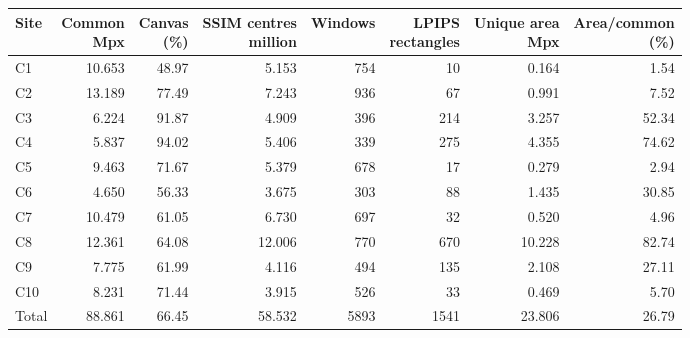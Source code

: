 \begin{tabular*}{\textwidth}{@{\extracolsep{\fill}}lrrrrrrr@{}}
\toprule
Site & \shortstack{Common\\Mpx} & \shortstack{Canvas\\(\%)} & \shortstack{SSIM centres\\million} & Windows & \shortstack{LPIPS\\rectangles} & \shortstack{Unique area\\Mpx} & \shortstack{Area/common\\(\%)} \\
\midrule
C1 & 10.653 & 48.97 & 5.153 & 754 & 10 & 0.164 & 1.54 \\
C2 & 13.189 & 77.49 & 7.243 & 936 & 67 & 0.991 & 7.52 \\
C3 & 6.224 & 91.87 & 4.909 & 396 & 214 & 3.257 & 52.34 \\
C4 & 5.837 & 94.02 & 5.406 & 339 & 275 & 4.355 & 74.62 \\
C5 & 9.463 & 71.67 & 5.379 & 678 & 17 & 0.279 & 2.94 \\
C6 & 4.650 & 56.33 & 3.675 & 303 & 88 & 1.435 & 30.85 \\
C7 & 10.479 & 61.05 & 6.730 & 697 & 32 & 0.520 & 4.96 \\
C8 & 12.361 & 64.08 & 12.006 & 770 & 670 & 10.228 & 82.74 \\
C9 & 7.775 & 61.99 & 4.116 & 494 & 135 & 2.108 & 27.11 \\
C10 & 8.231 & 71.44 & 3.915 & 526 & 33 & 0.469 & 5.70 \\
\midrule
Total & 88.861 & 66.45 & 58.532 & 5893 & 1541 & 23.806 & 26.79 \\
\bottomrule
\end{tabular*}
